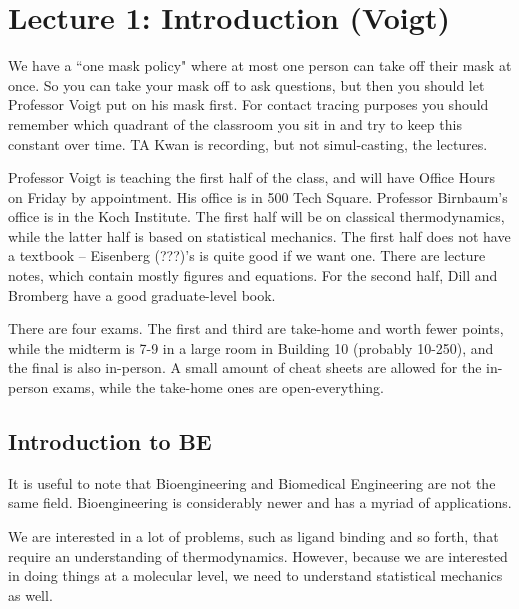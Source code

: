 \section*{Lecture 1: Introduction (Voigt)}
\setcounter{section}{1}

We have a ``one mask policy" where at most one person can take off their mask at once. So you can take your mask off to ask questions, but then you should let Professor Voigt put on his mask first. For contact tracing purposes you should remember which quadrant of the classroom you sit in and try to keep this constant over time. TA Kwan is recording, but not simul-casting, the lectures.

Professor Voigt is teaching the first half of the class, and will have Office Hours on Friday by appointment. His office is in 500 Tech Square. Professor Birnbaum's office is in the Koch Institute. The first half will be on classical thermodynamics, while the latter half is based on statistical mechanics. The first half does not have a textbook -- Eisenberg (???)'s is quite good if we want one. There are lecture notes, which contain mostly figures and equations. For the second half, Dill and Bromberg have a good graduate-level book.

There are four exams. The first and third are take-home and worth fewer points, while the midterm is 7-9 in a large room in Building 10 (probably 10-250), and the final is also in-person. A small amount of cheat sheets are allowed for the in-person exams, while the take-home ones are open-everything.

\subsection{Introduction to BE}

It is useful to note that Bioengineering and Biomedical Engineering are not the same field. Bioengineering is considerably newer and has a myriad of applications.

We are interested in a lot of problems, such as ligand binding and so forth, that require an understanding of thermodynamics. However, because we are interested in doing things at a molecular level, we need to understand statistical mechanics as well.


